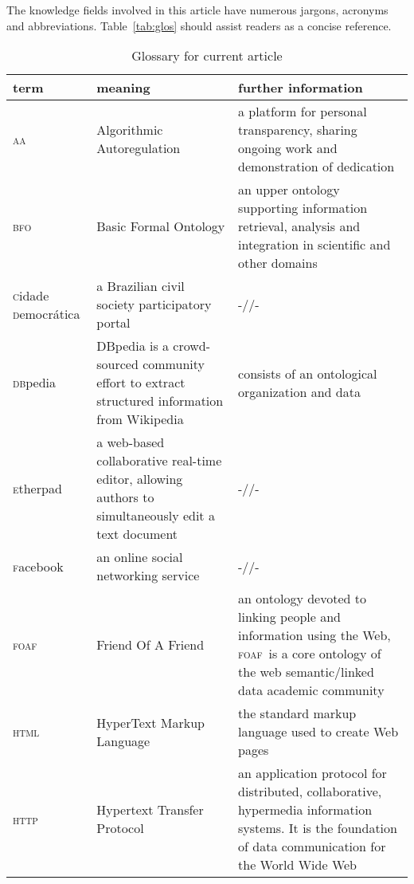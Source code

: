\documentclass{article}
\newcommand{\bfo}{\textsc{bfo}}
\newcommand{\dbpedia}{\textsc{db}pedia}
\newcommand{\foaf}{\textsc{foaf}}
\newcommand{\html}{\textsc{html}}
\newcommand{\facebook}{\textsc{f}acebook}
\newcommand{\etherpad}{\textsc{e}therpad}
\newcommand{\http}{\textsc{http}}
\newcommand{\aan}{\textsc{aa}}
\newcommand{\cidadedemocratica}{\textsc{c}idade \textsc{d}emocr\'atica}
\begin{document}
\vspace{-8cm}
The knowledge fields involved in this article have numerous jargons, acronyms and abbreviations. Table~\ref{tab:glos} should assist readers as a concise reference.
\begin{table}[!h]
  \footnotesize
  \vspace{-6mm}
  \centering
  \caption{Glossary for current article}
  \begin{tabular}{||l|p{5cm}|p{9cm}||}\hline
      {\bf term} & {\bf meaning} & {\bf further information} \\\hline\hline
      \aan  & Algorithmic Autoregulation & a platform for personal transparency, sharing ongoing work and demonstration of dedication \\\hline
      \bfo  & Basic Formal Ontology & an upper ontology supporting information retrieval, analysis and integration in scientific and other domains \\\hline
      \cidadedemocratica  & a Brazilian civil society participatory portal & -//- \\\hline
      \dbpedia  & DBpedia is a crowd-sourced community effort to extract structured information from Wikipedia & consists of an ontological organization and data \\\hline
      \etherpad  & a web-based collaborative real-time editor, allowing authors to simultaneously edit a text document & -//- \\\hline
      \facebook & an online social networking service & -//-  \\\hline
      \foaf  & Friend Of A Friend & an ontology devoted to linking people and information using the Web, \foaf\ is a core ontology of the web semantic/linked data academic community \\\hline
      \html  & HyperText Markup Language & the standard markup language used to create Web pages \\\hline
      \http  & Hypertext Transfer Protocol & an application protocol for distributed, collaborative, hypermedia information systems. It is the foundation of data communication for the World Wide Web \\\hline

\end{tabular}
\end{table}
\end{document}
